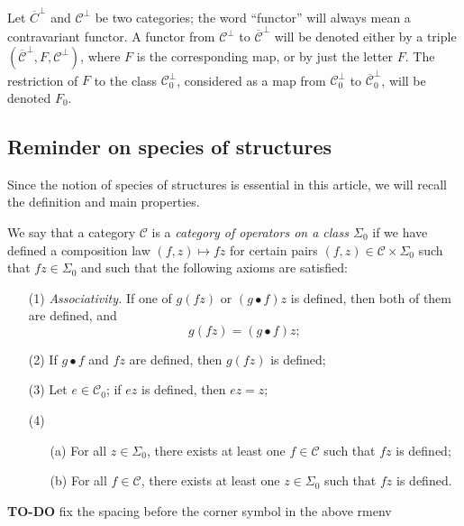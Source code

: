 \documentclass[a4paper,fleqn]{article}
\theoremstyle{plain}
\theoremstyle{definition}
\newenvironment{definition}[1]
  {\renewcommand\theinnerdefinition{#1}\innerdefinition}
  {\endinnerdefinition}
\newcommand{\todo}{{\color{purple}\textbf{TO-DO }}}
\newcommand{\CC}{\mathcal{C}}
\begin{document}
Let $\overline{C}^\perp$ and $\CC^\perp$ be two categories;
the word ``functor'' will always mean a contravariant functor.
A functor from $\CC^\perp$ to $\overline{\CC}^\perp$ will be denoted either by a triple $(\overline{\CC}^\perp,F,\CC^\perp)$, where $F$ is the corresponding map, or by just the letter $F$.
The restriction of $F$ to the class $\CC_0^\perp$, considered as a map from $\CC_0^\perp$ to $\overline{\CC}_0^\perp$, will be denoted $F_0$.



\subsection{Reminder on species of structures}
\label{section:i.2}

Since the notion of species of structures \cite{3a} is essential in this article, we will recall the definition and main properties.

\begin{definition}{1}
\label{definition:i-1}
  We say that a category $\CC$ is a \emph{category of operators on a class $\Sigma_0$} if we have defined a composition law $(f,z)\mapsto fz$ for certain pairs $(f,z)\in\CC\times\Sigma_0$ such that $fz\in\Sigma_0$ and such that the following axioms are satisfied:
  \begin{enumerate}
    \item[\normalfont(1)]
      \emph{Associativity.}
      If one of $g(fz)$ or $(g\bullet f)z$ is defined, then both of them are defined, and
      \[
        g(fz)
        = (g\bullet f)z;
      \]
    \item[\normalfont(2)]
      If $g\bullet f$ and $fz$ are defined, then $g(fz)$ is defined;
    \item[\normalfont(3)]
      Let $e\in\CC_0$;
      if $ez$ is defined, then $ez=z$;
    \item[\normalfont(4)]
      \begin{enumerate}
        \item[(a)]
          For all $z\in\Sigma_0$, there exists at least one $f\in\CC$ such that $fz$ is defined;
        \item[(b)]
          For all $f\in\CC$, there exists at least one $z\in\Sigma_0$ such that $fz$ is defined.
      \end{enumerate}
  \end{enumerate}
\end{definition}

\todo{fix the spacing before the corner symbol in the above rmenv}
\end{document}
